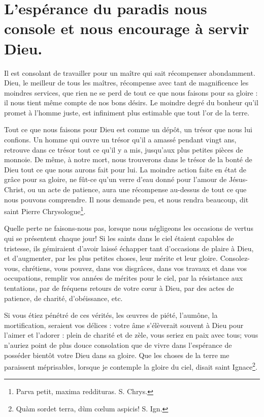 \documentclass[instructions.tex]{subfiles}
\begin{document}
 
\chapter{L'espérance du paradis nous console et nous encourage à servir Dieu.}
 
\primo Il est consolant de travailler pour un maître qui sait récompenser abondamment. Dieu, le meilleur de tous les maîtres, récompense avec tant de magnificence les moindres services, que rien ne se perd de tout ce que nous faisons pour sa gloire : il nous tient même compte de nos bons désirs. Le moindre degré du bonheur qu'il promet à l'homme juste, est infiniment plus estimable que tout l'or de la terre.
 
Tout ce que nous faisons pour Dieu est comme un dépôt, un trésor que nous lui confions. Un homme qui ouvre un trésor qu'il a amassé pendant vingt ans, retrouve dans ce trésor tout ce qu'il y a mis, jusqu'aux plus petites pièces de monnoie. De même, à notre mort, nous trouverons dans le trésor de la bonté de Dieu tout ce que nous aurons fait pour lui. La moindre action faite en état de grâce pour sa gloire, ne fût-ce qu'un verre d'eau donné pour l'amour de Jésus-Christ, ou un acte de patience, aura une récompense au-dessus de tout ce que nous pouvons comprendre. Il nous demande peu, et nous rendra beaucoup, dit saint Pierre Chrysologue\footnote{Parva petit, maxima reddituras. S. Chrys.}. 
 
Quelle perte ne faisons-nous pas, lorsque nous négligeons les occasions de vertus qui se présentent chaque jour! Si les saints dans le ciel étaient capables de tristesse, ils gémiraient d'avoir laissé échapper tant d'occasions de plaire à Dieu, et d'augmenter, par les plus petites choses, leur mérite et leur gloire. Consolez-vous, chrétiens, vous pouvez, dans vos disgrâces, dans vos travaux et dans vos occupations, remplir vos années de mérites pour le ciel, par la résistance aux tentations, par de fréquens retours de votre cœur à Dieu, par des actes de patience, de charité, d'obéissance, etc.
 
Si vous étiez pénétré de ces vérités, les œuvres de piété, l'aumône, la mortification, seraient vos délices : votre âme s'élèverait souvent à Dieu pour l'aimer et l'adorer : plein de charité et de zèle, vous seriez en paix avec tous; vous n'auriez point de plus douce consolation que de vivre dans l'espérance de posséder bientôt votre Dieu dans sa gloire. Que les choses de la terre me paraissent méprisables, lorsque je contemple la gloire du ciel, disait saint Ignace\footnote{Quàm sordet terra, dùm cœlum aspicis! S. Ign.}.
 
\end{document}
